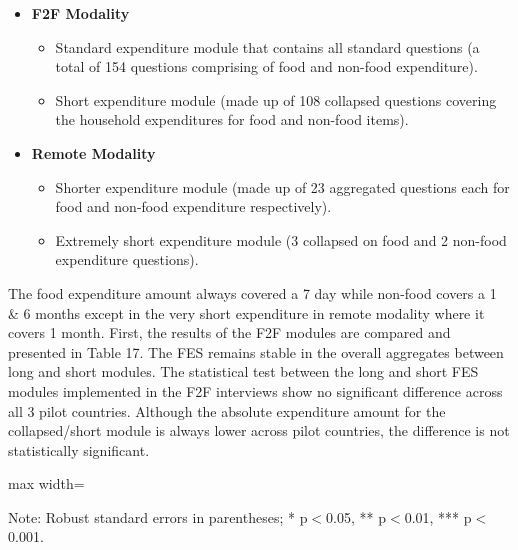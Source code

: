 \documentclass[11pt,harvard]{article}
\begin{document}
	\begin{itemize}[left=1.5em]
		\item\textbf{F2F Modality}
			\begin{itemize}[left=1.75em]
			\item[1.] Standard expenditure module that contains all standard questions (a total of 154 questions comprising of food and non-food expenditure).
			\item[2.] Short expenditure module (made up of 108 collapsed questions covering the household expenditures for food and non-food items).
			\end{itemize}
		\item\textbf{Remote Modality} 
			\begin{itemize}[left=1.75em]
			\item[1.] Shorter expenditure module (made up of 23 aggregated questions each for food and non-food expenditure respectively).
			\item[2.] Extremely short expenditure module (3 collapsed on food and 2 non-food expenditure questions).
		\end{itemize}

	\end{itemize}
	
The food expenditure amount always covered a 7 day while non-food covers a 1 \& 6 months except in the very short expenditure in remote modality where it covers 1 month. First, the results of the F2F modules are compared and presented in Table 17. The FES remains stable in the overall aggregates between long and short modules. The statistical test between the long and short FES modules implemented in the F2F interviews show no significant difference across all 3 pilot countries. Although the absolute expenditure amount for the collapsed/short module is always lower across pilot countries, the difference is not statistically significant. 
	
	\begin{table}[htbp]
		\centering
		\begin{adjustbox}{max width=\textwidth}
			\begin{threeparttable}
				\caption{Impact of Module Length on Expenditure and FES in F2F Surveys}
				\scriptsize
				 
				\label{tab:FES_F2F_Form_Length_All_Country}
				\begin{tablenotes}
					\item Note: Robust standard errors in parentheses; * p$<$0.05, ** p$<$0.01, *** p$<$0.001. 
				\end{tablenotes}
			\end{threeparttable}
		\end{adjustbox}
	\end{table}
	
\end{document}
